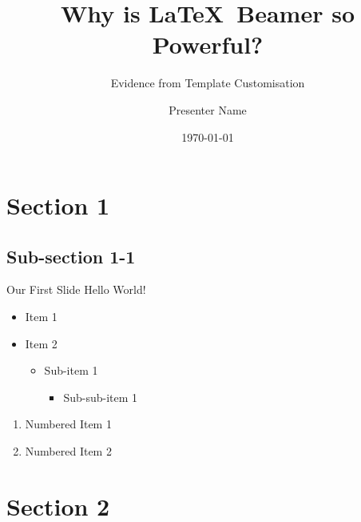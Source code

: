 \documentclass[aspectratio=149]{beamer}
\title[footer text]{Why is \LaTeX \ Beamer so Powerful?}
\subtitle{Evidence from Template Customisation}
\author{Presenter Name}
\institute{Department of Banking and Finance, Monash Business School}
\date{\today}
\begin{document}
{
\begin{frame}[noframenumbering]
  \titlepage
\end{frame}
}

{
\begin{frame}[t]
  \centering\vspace{3ex}{\LARGE\textcolor{monashblue}{Agenda}}
  \tableofcontents
\end{frame}
}

\section{Section 1}

\subsection{Sub-section 1-1}

\begin{frame}{Our First Slide}
  Hello World!
  \vspace{\baselineskip}
  \vspace{\baselineskip}

  \begin{itemize}
    \item Item 1
    \item Item 2
          \begin{itemize}
            \item Sub-item 1
                  \begin{itemize}
                    \item Sub-sub-item 1
                  \end{itemize}
          \end{itemize}
  \end{itemize}

  \begin{enumerate}
    \item Numbered Item 1
    \item Numbered Item 2
  \end{enumerate}
\end{frame}

\section{Section 2}
\end{document}
